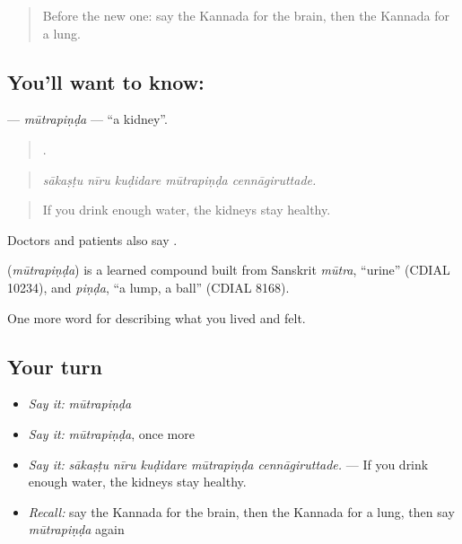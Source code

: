 \label{lesson:KA-C508-mutrapinda}



\begin{quote}
Before the new one: say the Kannada for the brain, then the Kannada for a lung.
\end{quote}

\subsection*{You'll want to know: }
\textbf{} — \emph{mūtrapiṇḍa} — \textquotedblleft{}a kidney\textquotedblright{}.

\begin{quote}
    .
\end{quote}

\begin{quote}
\emph{sākaṣṭu nīru kuḍidare mūtrapiṇḍa cennāgiruttade.}
\end{quote}

\begin{quote}
If you drink enough water, the kidneys stay healthy.
\end{quote}

Doctors and patients also say .

\begin{cousinweb}
\textbf{} (\emph{mūtrapiṇḍa}) is a learned compound built from Sanskrit \emph{mūtra}, \textquotedblleft{}urine\textquotedblright{} (CDIAL 10234), and \emph{piṇḍa}, \textquotedblleft{}a lump, a ball\textquotedblright{} (CDIAL 8168).
\end{cousinweb}

\begin{grammarlens}[title={What you've built}]
One more word for describing what you lived and felt.
\end{grammarlens}

\subsection*{Your turn}
\begin{itemize}
\raggedright
  \item \emph{Say it:} \emph{mūtrapiṇḍa}
  \item \emph{Say it:} \emph{mūtrapiṇḍa}, once more
  \item \emph{Say it:} \emph{sākaṣṭu nīru kuḍidare mūtrapiṇḍa cennāgiruttade.} — If you drink enough water, the kidneys stay healthy.
  \item \emph{Recall:} say the Kannada for the brain, then the Kannada for a lung, then say \emph{mūtrapiṇḍa} again
\end{itemize}

